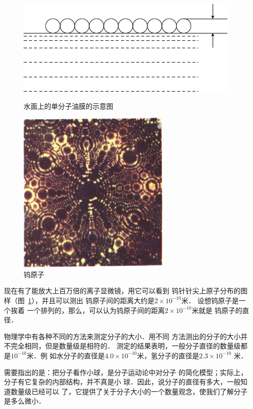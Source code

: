 \begin{figure}[htbp]
    \centering
    \begin{minipage}[t]{0.48\linewidth}
    	\centering
    	\includegraphics{fig/B/1-1.pdf}
    	\caption{水面上的单分子油膜的示意图}\label{fig_B_1-1}
    \end{minipage}
    \begin{minipage}[t]{0.48\linewidth}
    	\centering
    	\includegraphics[scale=0.666]{fig/B/0-1.png}
    	\caption{钨原子}\label{fig_B_0-1}
	\end{minipage}
\end{figure}

    现在有了能放大上百万倍的离子显微镜，用它可以看到
钨针针尖上原子分布的图样（图~\ref{fig_B_0-1}），并且可以测出
钨原子间的距离大约是$2\times 10^{-10}$米．
设想钨原子是一个挨着
一个排列的，那么，可以认为钨原子间的距离$2\times 10^{-10}$米就是
钨原子的直径．


    物理学中有各种不同的方法来测定分子的大小．用不同
方法测出的分子的大小并不完全相同，但是数量级是相符的．
测定的结果表明，一般分子直径的数量级都是$10^{-10}$米．例
如水分子的直径是$4.0\times 10^{-10}$米，氢分子的直径是$2.3\times 10^{-10}$
米．

    需要指出的是：把分子看作小球，是分子运动论中对分子
的简化模型；实际上，分子有它复杂的内部结构，并不真是小
球．因此，说分子的直径有多大，一般知道数量级已经可以
了，它提供了关于分子大小的一个数量观念，使我们了解分子
是多么微小．

